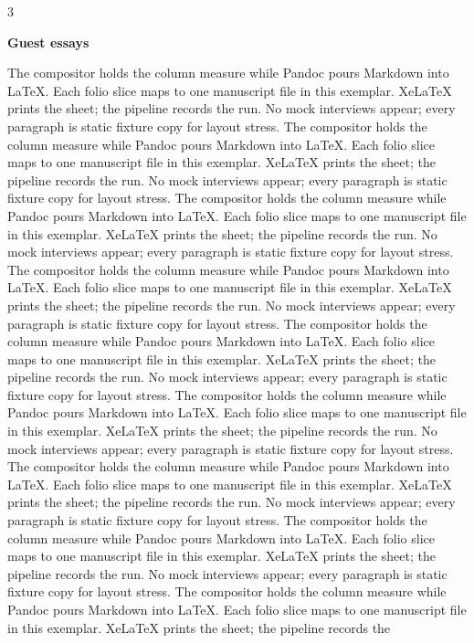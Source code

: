 \documentclass[
]{article}
\begin{document}
\begin{multicols}{3}

\textbf{Guest essays}

The compositor holds the column measure while Pandoc pours Markdown into
LaTeX. Each folio slice maps to one manuscript file in this exemplar.
XeLaTeX prints the sheet; the pipeline records the run. No mock
interviews appear; every paragraph is static fixture copy for layout
stress. The compositor holds the column measure while Pandoc pours
Markdown into LaTeX. Each folio slice maps to one manuscript file in
this exemplar. XeLaTeX prints the sheet; the pipeline records the run.
No mock interviews appear; every paragraph is static fixture copy for
layout stress. The compositor holds the column measure while Pandoc
pours Markdown into LaTeX. Each folio slice maps to one manuscript file
in this exemplar. XeLaTeX prints the sheet; the pipeline records the
run. No mock interviews appear; every paragraph is static fixture copy
for layout stress. The compositor holds the column measure while Pandoc
pours Markdown into LaTeX. Each folio slice maps to one manuscript file
in this exemplar. XeLaTeX prints the sheet; the pipeline records the
run. No mock interviews appear; every paragraph is static fixture copy
for layout stress. The compositor holds the column measure while Pandoc
pours Markdown into LaTeX. Each folio slice maps to one manuscript file
in this exemplar. XeLaTeX prints the sheet; the pipeline records the
run. No mock interviews appear; every paragraph is static fixture copy
for layout stress. The compositor holds the column measure while Pandoc
pours Markdown into LaTeX. Each folio slice maps to one manuscript file
in this exemplar. XeLaTeX prints the sheet; the pipeline records the
run. No mock interviews appear; every paragraph is static fixture copy
for layout stress. The compositor holds the column measure while Pandoc
pours Markdown into LaTeX. Each folio slice maps to one manuscript file
in this exemplar. XeLaTeX prints the sheet; the pipeline records the
run. No mock interviews appear; every paragraph is static fixture copy
for layout stress. The compositor holds the column measure while Pandoc
pours Markdown into LaTeX. Each folio slice maps to one manuscript file
in this exemplar. XeLaTeX prints the sheet; the pipeline records the
run. No mock interviews appear; every paragraph is static fixture copy
for layout stress. The compositor holds the column measure while Pandoc
pours Markdown into LaTeX. Each folio slice maps to one manuscript file
in this exemplar. XeLaTeX prints the sheet; the pipeline records the

\end{multicols}
\end{document}
